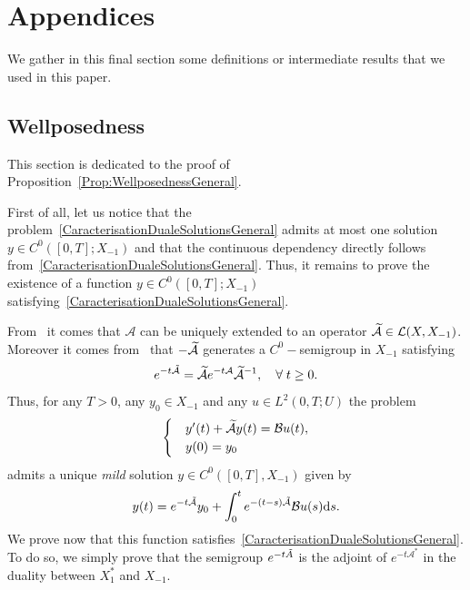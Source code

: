 \documentclass[11pt]{article}
\theoremstyle{definition}
\numberwithin{equation}{section}
\numberwithin{figure}{section}
\numberwithin{table}{section}
\newcommand\A{\mathcal{A}}
\newcommand\As{\mathcal{A}^*}
\newcommand\B{\mathcal{B}}
\newcommand{\Xuns}{X_1^*}
\newcommand{\Xmun}{X_{-1}}
\newcommand{\LL}{\mathcal{L}}
\newcommand{\md}{\mathrm{d}}
\let\oldtilde\tilde
\renewcommand*{\tilde}[1]{\mathchoice{\widetilde{#1}}{\widetilde{#1}}{\oldtilde{#1}}{\oldtilde{#1}}}\let\oldexists\exists
\renewcommand*{\exists}{\mathrel{\oldexists}}
\let\oldforall\forall
\renewcommand*{\forall}{\mathrel{\oldforall}}
\begin{document}
\section{Appendices} \label{Sec:Annexe}

We gather in this final section some definitions or intermediate results that we used in this paper.


\subsection{Wellposedness} \label{Sec:AnnexeWellposedness}


This section is dedicated to the proof of Proposition~\ref{Prop:WellposednessGeneral}.

First of all, let us notice that the problem~\eqref{CaracterisationDualeSolutionsGeneral} admits at most one solution $y \in C^0([0,T]; \Xmun)$ and that the continuous dependency directly follows from~\eqref{CaracterisationDualeSolutionsGeneral}. Thus, it remains to prove the existence of a function $y \in C^0([0,T]; \Xmun)$ satisfying~\eqref{CaracterisationDualeSolutionsGeneral}.

From~\cite[Proposition~2.10.3]{TucsnakWeissBook} it comes that $\A$ can be uniquely extended to an operator $\tilde{\A} \in \LL(X, \Xmun)$. Moreover it comes from~\cite[Proposition~2.10.4]{TucsnakWeissBook} that $-\tilde{\A}$ generates a $C^0-$semigroup in $\Xmun$ satisfying
\begin{equation*}\label{Def:SemiGroupeEtendu}
e^{-t \tilde{\A}} = \tilde{\A} e^{-t \A} \tilde{\A}^{-1}, \quad \forall t \geq 0.
\end{equation*}
Thus, for any $T>0$, any $y_0 \in \Xmun$ and any $u \in L^2(0,T ; U)$ the problem
\begin{equation*}\label{systemeEtendu}
\begin{cases}
&y'(t) + \tilde{\A} y(t) = \B u(t),
\\
&y(0) = y_0
\end{cases}
\end{equation*}
admits a unique \emph{mild} solution $y \in C^0([0,T], \Xmun)$ given by
\begin{equation}\label{MildSolution}
y(t) = e^{-t \tilde{\A}} y_0 + \int_0^t e^{-(t-s) \tilde{\A}} \B u(s) \md s.
\end{equation}
We prove now that this function satisfies~\eqref{CaracterisationDualeSolutionsGeneral}. To do so, we simply prove that the semigroup $e^{-t \tilde{A}}$ is the adjoint of $e^{-t\As}$ in the duality between $\Xuns$ and $\Xmun$.
\end{document}
